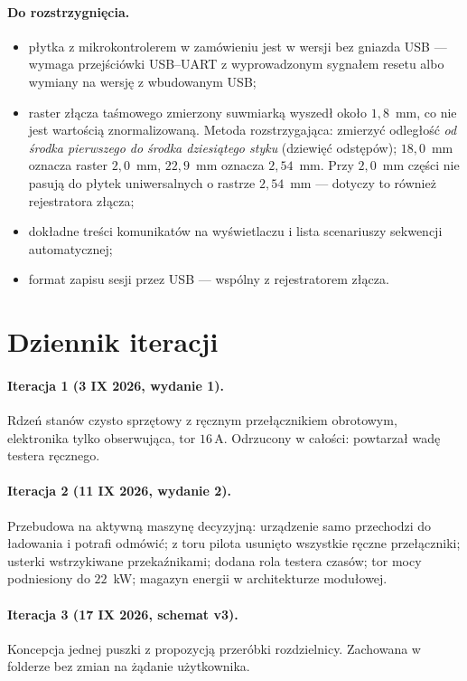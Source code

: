 \documentclass[a4paper,11pt]{article}
\newcommand{\amp}{\,\mathrm{A}}
\begin{document}
\paragraph{Do rozstrzygnięcia.}
\begin{itemize}
\item płytka z mikrokontrolerem w zamówieniu jest w wersji bez gniazda USB ---
      wymaga przejściówki USB--UART z wyprowadzonym sygnałem resetu albo wymiany
      na wersję z wbudowanym USB;
\item raster złącza taśmowego zmierzony suwmiarką wyszedł około $1{,}8$~mm, co nie
      jest wartością znormalizowaną. Metoda rozstrzygająca: zmierzyć odległość
      \emph{od środka pierwszego do środka dziesiątego styku} (dziewięć odstępów);
      $18{,}0$~mm oznacza raster $2{,}0$~mm, $22{,}9$~mm oznacza $2{,}54$~mm.
      Przy $2{,}0$~mm części nie pasują do płytek uniwersalnych o rastrze
      $2{,}54$~mm --- dotyczy to również rejestratora złącza;
\item dokładne treści komunikatów na wyświetlaczu i lista scenariuszy sekwencji
      automatycznej;
\item format zapisu sesji przez USB --- wspólny z rejestratorem złącza.
\end{itemize}

\section{Dziennik iteracji}
\label{sec:dziennik}

\paragraph{Iteracja 1 (3 IX 2026, wydanie 1).} Rdzeń stanów czysto sprzętowy
z ręcznym przełącznikiem obrotowym, elektronika tylko obserwująca, tor $16\amp$.
Odrzucony w całości: powtarzał wadę testera ręcznego.

\paragraph{Iteracja 2 (11 IX 2026, wydanie 2).} Przebudowa na aktywną maszynę
decyzyjną: urządzenie samo przechodzi do ładowania i potrafi odmówić; z toru pilota
usunięto wszystkie ręczne przełączniki; usterki wstrzykiwane przekaźnikami; dodana
rola testera czasów; tor mocy podniesiony do $22$~kW; magazyn energii
w architekturze modułowej.

\paragraph{Iteracja 3 (17 IX 2026, schemat v3).} Koncepcja jednej puszki
z propozycją przeróbki rozdzielnicy. Zachowana w folderze bez zmian na żądanie
użytkownika.
\end{document}
